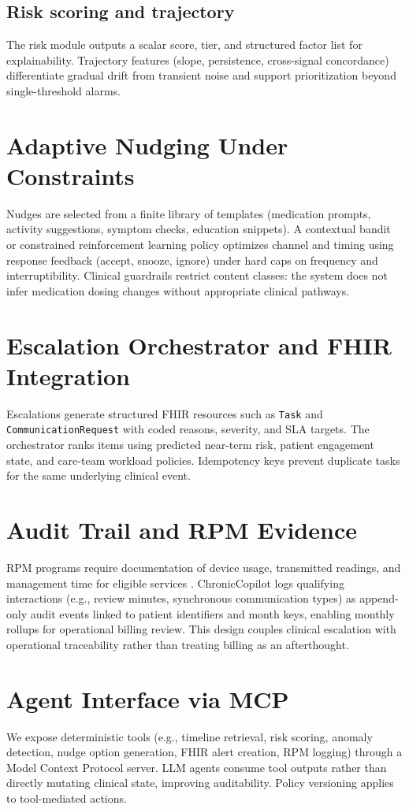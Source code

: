 \documentclass[conference]{IEEEtran}
\begin{document}
\subsection{Risk scoring and trajectory}
The risk module outputs a scalar score, tier, and structured factor list for explainability. Trajectory features (slope, persistence, cross-signal concordance) differentiate gradual drift from transient noise and support prioritization beyond single-threshold alarms.

\section{Adaptive Nudging Under Constraints}
Nudges are selected from a finite library of templates (medication prompts, activity suggestions, symptom checks, education snippets). A contextual bandit or constrained reinforcement learning policy optimizes channel and timing using response feedback (accept, snooze, ignore) under hard caps on frequency and interruptibility. Clinical guardrails restrict content classes: the system does not infer medication dosing changes without appropriate clinical pathways.

\section{Escalation Orchestrator and FHIR Integration}
Escalations generate structured FHIR resources such as \texttt{Task} and \texttt{CommunicationRequest} with coded reasons, severity, and SLA targets. The orchestrator ranks items using predicted near-term risk, patient engagement state, and care-team workload policies. Idempotency keys prevent duplicate tasks for the same underlying clinical event.

\section{Audit Trail and RPM Evidence}
RPM programs require documentation of device usage, transmitted readings, and management time for eligible services \cite{cmsrpm}. ChronicCopilot logs qualifying interactions (e.g., review minutes, synchronous communication types) as append-only audit events linked to patient identifiers and month keys, enabling monthly rollups for operational billing review. This design couples clinical escalation with operational traceability rather than treating billing as an afterthought.

\section{Agent Interface via MCP}
We expose deterministic tools (e.g., timeline retrieval, risk scoring, anomaly detection, nudge option generation, FHIR alert creation, RPM logging) through a Model Context Protocol server. LLM agents consume tool outputs rather than directly mutating clinical state, improving auditability. Policy versioning applies to tool-mediated actions.
\end{document}
